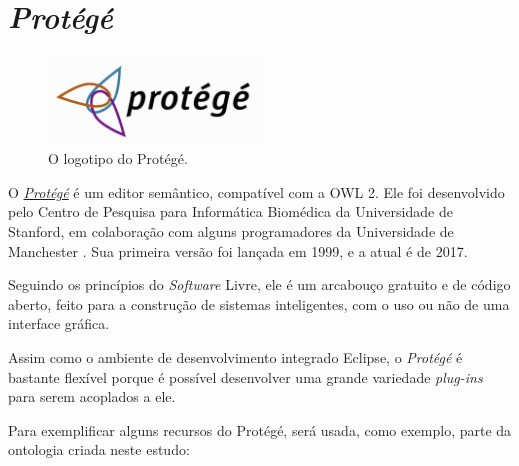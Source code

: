 \section{\textit{Protégé}}

\begin{figure}[H]
	\centering
	\includegraphics[width=0.5\textwidth]{Capitulos/Ferramentas/protege}
	\caption{O logotipo do Protégé.}
\end{figure}

O \href{https://protege.stanford.edu}{\textit{Protégé}} é um editor semântico, compatível com a OWL 2. Ele foi desenvolvido pelo Centro de Pesquisa para Informática Biomédica da Universidade de Stanford, em colaboração com alguns programadores da Universidade de Manchester \cite{ferramentasProtege}. Sua primeira versão foi lançada em 1999, e a atual é de 2017.

Seguindo os princípios do \textit{Software} Livre, ele é um arcabouço gratuito e de código aberto, feito para a construção de sistemas inteligentes, com o uso ou não de uma interface gráfica.

Assim como o ambiente de desenvolvimento integrado Eclipse, o \textit{Protégé} é bastante flexível porque é possível desenvolver uma grande variedade \textit{plug-ins} para serem acoplados a ele.

Para exemplificar alguns recursos do Protégé, será usada, como exemplo, parte da ontologia criada neste estudo:

